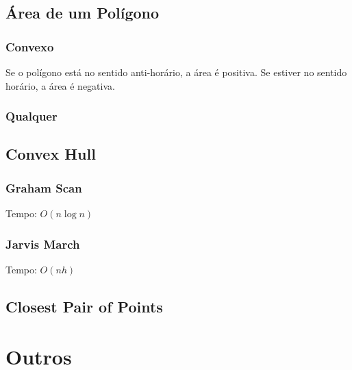 \documentclass[12pt,a4paper]{article}
\begin{document}
		\subsection{Área de um Polígono}
			\subsubsection{Convexo}
				Se o polígono está no sentido anti-horário, a área é positiva. Se estiver no sentido horário, a área é negativa.
				
			\subsubsection{Qualquer}
				
		\subsection{Convex Hull}
			\subsubsection{Graham Scan}
				Tempo: \(O(n \log n)\)
				
			\subsubsection{Jarvis March}
				Tempo: \(O(n h)\)
				
		\subsection{Closest Pair of Points}
			

	\section{Outros}
\end{document}

